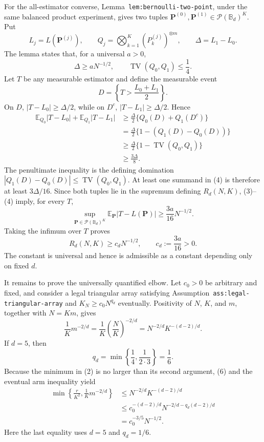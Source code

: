 For the all-estimator converse, Lemma~\texttt{lem:bernoulli-two-point}, under the same balanced product experiment, gives two tuples \(\mathbf P^{(0)},\mathbf P^{(1)}\in\mathcal P(\mathbb B_d)^K\).  Put
\[
L_j=L(\mathbf P^{(j)}),
\qquad
Q_j=\bigotimes_{k=1}^K(P_k^{(j)})^{\otimes m},
\qquad
\Delta=L_1-L_0.
\]
The lemma states that, for a universal \(a>0\),
\[
\Delta\ge aN^{-1/2},
\qquad
\operatorname{TV}(Q_0,Q_1)\le\frac14.
\tag{3}
\]
Let \(T\) be any measurable estimator and define the measurable event
\[
D=\left\{T>\frac{L_0+L_1}{2}\right\}.
\]
On \(D\), \(|T-L_0|\ge\Delta/2\), while on \(D^c\), \(|T-L_1|\ge\Delta/2\).  Hence
\[
\begin{aligned}
\mathbb E_{Q_0}|T-L_0|+\mathbb E_{Q_1}|T-L_1|
&\ge\frac\Delta2\{Q_0(D)+Q_1(D^c)\}\\
&=\frac\Delta2\{1-(Q_1(D)-Q_0(D))\}\\
&\ge\frac\Delta2\{1-\operatorname{TV}(Q_0,Q_1)\}\\
&\ge\frac{3\Delta}{8}.
\end{aligned}
\tag{4}
\]
The penultimate inequality is the defining domination \(|Q_1(D)-Q_0(D)|\le\operatorname{TV}(Q_0,Q_1)\).  At least one summand in (4) is therefore at least \(3\Delta/16\).  Since both tuples lie in the supremum defining \(R_d(N,K)\), (3)--(4) imply, for every \(T\),
\[
\sup_{\mathbf P\in\mathcal P(\mathbb B_d)^K}
\mathbb E_{\mathbf P}|T-L(\mathbf P)|
\ge\frac{3a}{16}N^{-1/2}.
\]
Taking the infimum over \(T\) proves
\[
R_d(N,K)\ge c_dN^{-1/2},
\qquad c_d:=\frac{3a}{16}>0.
\tag{5}
\]
The constant is universal and hence is admissible as a constant depending only on fixed \(d\).

It remains to prove the universally quantified elbow.  Let \(c_0>0\) be arbitrary and fixed, and consider a legal triangular array satisfying Assumption~\texttt{ass:legal-triangular-array} and \(K_N\ge c_0N^{q_d}\) eventually.  Positivity of \(N\), \(K\), and \(m\), together with \(N=Km\), gives
\[
\frac1K m^{-2/d}
=\frac1K\left(\frac NK\right)^{-2/d}
=N^{-2/d}K^{-(d-2)/d}.
\tag{6}
\]
If \(d=5\), then
\[
q_d=\min\left\{\frac14,\frac1{2\cdot3}\right\}=\frac16.
\]
Because the minimum in (2) is no larger than its second argument, (6) and the eventual arm inequality yield
\[
\begin{aligned}
\min\left\{\frac r{K^2},\frac1K m^{-2/d}\right\}
&\le N^{-2/d}K^{-(d-2)/d}\\
&\le c_0^{-(d-2)/d}
N^{-2/d-q_d(d-2)/d}\\
&=c_0^{-3/5}N^{-1/2}.
\end{aligned}
\tag{7}
\]
Here the last equality uses \(d=5\) and \(q_d=1/6\).

